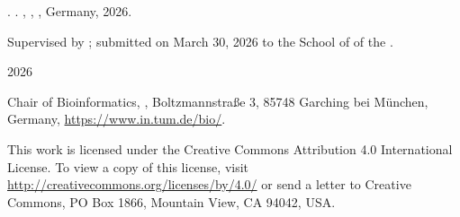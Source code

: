 \thispagestyle{empty}

\vspace*{0.55\textheight}

\noindent
\getAuthor{}. \emph{\getTitle{}}. \MakeLowercase{\getDoctype{}}, \getUniversity{}, \getSubmissionLocation{}, Germany, 2026.

\medskip

\noindent
Supervised by \getSupervisor{}; submitted on March 30, 2026 to the School of \getSchool{} of the \getUniversity{}.

\medskip

\noindent
\textcopyright{} 2026 \getAuthor{}

\medskip

\noindent
Chair of Bioinformatics, \getUniversity{}, Boltzmannstra{\ss}e 3, 85748 Garching bei M\"unchen, Germany, \url{https://www.in.tum.de/bio/}.

\medskip

\noindent
This work is licensed under the Creative Commons Attribution 4.0 International License. To view a copy of this license, visit \url{http://creativecommons.org/licenses/by/4.0/} or send a letter to Creative Commons, PO Box 1866, Mountain View, CA 94042, USA.

\clearpage{}
